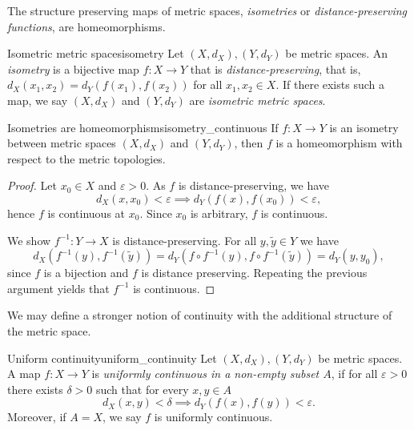 The structure preserving maps of metric spaces, \emph{isometries} or \emph{distance-preserving functions}, are homeomorphisms.
\begin{definition}{Isometric metric spaces}{isometry}
    Let \((X, d_X), (Y, d_Y)\) be metric spaces. An \emph{isometry} is a bijective map \(f : X \to Y\) that is \emph{distance-preserving}, that is, \(d_X(x_1, x_2) = d_Y(f(x_1), f(x_2))\) for all \(x_1,x_2 \in X\). If there exists such a map, we say \((X, d_X)\) and \((Y, d_Y)\) are \emph{isometric metric spaces}.
\end{definition}
\begin{proposition}{Isometries are homeomorphisms}{isometry_continuous}
    If \(f: X \to Y\) is an isometry between metric spaces \((X, d_X)\) and \((Y, d_Y)\), then \(f\) is a homeomorphism with respect to the metric topologies.
\end{proposition}
\begin{proof}
    Let \(x_0 \in X\) and \(\varepsilon > 0\). As \(f\) is distance-preserving, we have
    \begin{equation*}
        d_X(x, x_0) < \varepsilon \implies d_Y(f(x), f(x_0)) < \varepsilon,
    \end{equation*}
    hence \(f\) is continuous at \(x_0\). Since \(x_0\) is arbitrary, \(f\) is continuous.

    We show \(f^{-1} : Y \to X\) is distance-preserving. For all \(y, \tilde{y} \in Y\) we have
    \begin{equation*}
        d_X(f^{-1}(y), f^{-1}(\tilde{y})) = d_Y\left(f \circ f^{-1} (y), f \circ f^{-1} (\tilde{y})\right) = d_Y(y, y_0),
    \end{equation*}
    since \(f\) is a bijection and \(f\) is distance preserving. Repeating the previous argument yields that \(f^{-1}\) is continuous.
\end{proof}

We may define a stronger notion of continuity with the additional structure of the metric space.
\begin{definition}{Uniform continuity}{uniform_continuity}
    Let \((X, d_X), (Y, d_Y)\) be metric spaces. A map \(f : X \to Y\) is \emph{uniformly continuous in a non-empty subset \(A\)}, if for all \(\varepsilon > 0\) there exists \(\delta > 0\) such that for every \(x,y \in A\)
    \begin{equation*}
        d_X(x, y) < \delta \implies d_Y(f(x), f(y)) < \varepsilon.
    \end{equation*}
    Moreover, if \(A = X\), we say \(f\) is uniformly continuous.
\end{definition}

